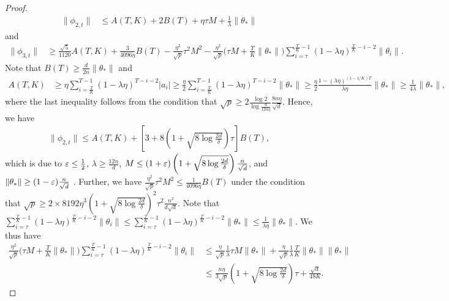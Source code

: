 \begin{proof}
    \begin{align*}
        \|\phi_{2,t}\| & \leq A(T,K) + 2B(T) + \eta\tau M + \frac{1}{\lambda} \|\theta_*\|
    \end{align*}
    and
    \begin{align*}
        \|\phi_{3,t}\| & \geq \frac{\sqrt{5}}{1120} A(T,K) + \frac{3}{4096\eta} B(T) - \frac{\eta^2}{\sqrt p} \tau^2 M^2 - \frac{\eta^2}{\sqrt p} \Big( \tau M + \frac{T}{K} \|\theta_*\| \Big) \sum_{i=\tau}^{\frac{T}{K}-1}(1 - \lambda\eta)^{\frac{T}{K}-i-2} \|\theta_i\|.
    \end{align*}
    Note that $B(T) \geq \frac{d}{2n} \|\theta_*\|$ and
    \begin{align*}
        A(T,K) & \geq \eta\sum_{i=\frac{T}{K}}^{T-1}(1-\lambda\eta)^{T-i-2} |a_i| \geq \frac{\eta}{2}\sum_{i=\frac{T}{K}}^{T-1}(1-\lambda\eta)^{T-i-2} \|\theta_*\| \geq \frac{\eta}{2} \frac{1 - (\lambda\eta)^{(1-1/K)T}}{\lambda\eta} \|\theta_*\| \geq \frac{1}{4\lambda} \|\theta_*\|,
    \end{align*}
    where the last inequality follows from the condition that $\sqrt{p} \geq 2 \frac{\log 2}{\log\frac{d}{12n\eta}}\frac{8n\eta}{\sqrt{d}}$. Hence, we have 
    \begin{align*}
        \|\phi_{2,t}\| \leq A(T,K) + \left[ 3 + 8\left(1 + \sqrt{8\log\frac{2d}{\delta}}\right)\tau \right] B(T),
    \end{align*}
    which is due to $\varepsilon\leq \frac{1}{2}$, $\lambda \geq \frac{12n}{d}$, $M \leq (1+\varepsilon)\left(1 + \sqrt{8\log\frac{2d}{\delta}}\right)\frac{n}{\sqrt{d}}$, and $\|\theta_*\|\geq (1-\varepsilon)\frac{n}{\sqrt{d}}$ . Further, we have $\frac{\eta^2}{\sqrt p} \tau^2 M^2 \leq \frac{1}{4096\eta} B(T)$ under the condition that $\sqrt{p} \geq 2\times 8192\eta^3\left(1 + \sqrt{8\log\frac{2d}{\delta}}\right)^2 \tau^2 \frac{n^2}{d\sqrt{d}}$. Note that $\sum_{i=\tau}^{\frac{T}{K}-1}(1 - \lambda\eta)^{\frac{T}{K}-i-2} \|\theta_i\| \leq \sum_{i=\tau}^{\frac{T}{K}-1}(1 - \lambda\eta)^{\frac{T}{K}-i-2} \|\theta_*\| \leq \frac{1}{\lambda\eta} \|\theta_*\|$. We thus have 
    \begin{align*}
        \frac{\eta^2}{\sqrt p} \Big( \tau M + \frac{T}{K} \|\theta_*\| \Big) \sum_{i=\tau}^{\frac{T}{K}-1}(1 - \lambda\eta)^{\frac{T}{K}-i-2} \|\theta_i\| & \leq \frac{\eta}{\sqrt p} \frac{1}{\lambda} \tau M \|\theta_*\| + \frac{\eta}{\sqrt p} \frac{1}{\lambda} \frac{T}{K} \|\theta_*\| \|\theta_*\| \\
        & \leq \frac{n\eta}{3\sqrt{p}} \left(1 + \sqrt{8\log\frac{2d}{\delta}}\right) \tau + \frac{\sqrt{d}}{48K}.

\end{align*}
\end{proof}
